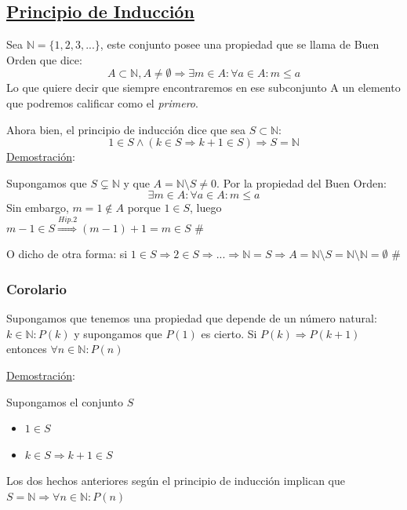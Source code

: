 \documentclass[10pt,a4paper,openright]{book}
\begin{document}
\subsection*{\underline{Principio de Inducción}}
Sea $\mathbb N=\{1, 2, 3,...\}$, este conjunto posee una propiedad que se llama de Buen Orden que dice:
$$A\subset \mathbb N, A\neq \emptyset \Rightarrow \exists m \in A : \forall a \in A : m\leq a$$
Lo que quiere decir que siempre encontraremos en ese subconjunto A un elemento que podremos calificar como el \textit{primero}.\par
Ahora bien, el principio de inducción dice que sea $S\subset \mathbb N$:
$$1\in S\wedge (k\in S\Rightarrow k+1\in S)\Rightarrow S=\mathbb N$$
\underline{Demostración}:\par
Supongamos que $S\subsetneq \mathbb N$ y que $A=\mathbb N\mbox{\textbackslash} S\neq 0$. Por la propiedad del Buen Orden:
$$\exists m \in A : \forall a \in A: m\leq a$$
Sin embargo, $m=1\notin A$ porque $1\in S$, luego $m-1\in S\stackrel{Hip. 2}{\Rightarrow} (m-1)+1=m\in S \mbox{ \#}$\par
O dicho de otra forma: si $1\in S\Rightarrow 2\in S \Rightarrow ... \Rightarrow \mathbb N=S\Rightarrow A=\mathbb N \mbox{\textbackslash} S=\mathbb N \mbox{\textbackslash} \mathbb N=\emptyset \mbox{ \#}$
\subsubsection*{Corolario}
Supongamos que tenemos una propiedad que depende de un número natural: $k \in \mathbb N : P(k)$ y supongamos que $P(1)$ es cierto. Si $P(k)\Rightarrow P(k+1)$ entonces $\forall n \in \mathbb N : P(n)$

\underline{Demostración}:\par
Supongamos el conjunto $S$
\begin{itemize}
\item $1\in S$
\item $k\in S\Rightarrow k+1\in S$
\end{itemize}
Los dos hechos anteriores según el principio de inducción implican que $S=\mathbb N\Rightarrow \forall n \in \mathbb N : P(n)$
\end{document}
